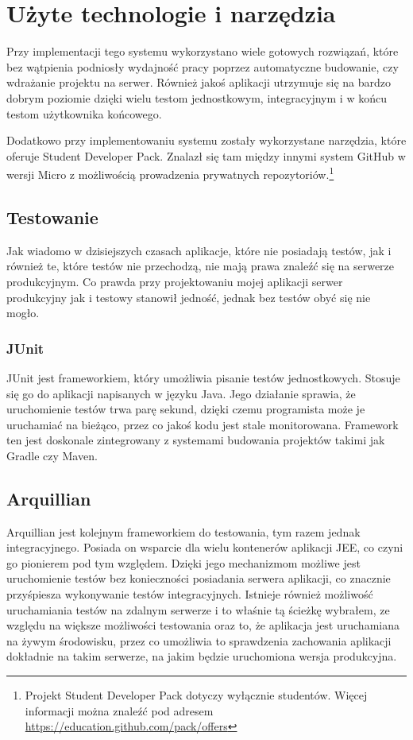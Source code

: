 \section{Użyte technologie i narzędzia}
Przy implementacji tego systemu wykorzystano wiele gotowych rozwiązań, które bez wątpienia podniosły wydajność pracy poprzez automatyczne budowanie, czy wdrażanie projektu na serwer. Również jakoś aplikacji utrzymuje się na bardzo dobrym poziomie dzięki wielu testom jednostkowym, integracyjnym i w końcu testom użytkownika końcowego. 

Dodatkowo przy implementowaniu systemu zostały wykorzystane narzędzia, które oferuje Student Developer Pack. Znalazł się tam między innymi system GitHub w wersji Micro z możliwością prowadzenia prywatnych repozytoriów.\footnote{Projekt Student Developer Pack dotyczy wyłącznie studentów. Więcej informacji można znaleźć pod adresem \url{https://education.github.com/pack/offers}}

\subsection{Testowanie}
Jak wiadomo w dzisiejszych czasach aplikacje, które nie posiadają testów, jak i również te, które testów nie przechodzą, nie mają prawa znaleźć się na serwerze produkcyjnym. Co prawda przy projektowaniu mojej aplikacji serwer produkcyjny jak i testowy stanowił jedność, jednak bez testów obyć się nie mogło.

\subsubsection{JUnit}
JUnit jest frameworkiem, który umożliwia pisanie testów jednostkowych. Stosuje się go do aplikacji napisanych w języku Java. Jego działanie sprawia, że uruchomienie testów trwa parę sekund, dzięki czemu programista może je uruchamiać na bieżąco, przez co jakoś kodu jest stale monitorowana. Framework ten jest doskonale zintegrowany z systemami budowania projektów takimi jak Gradle czy Maven. 

\subsection{Arquillian}
Arquillian jest kolejnym frameworkiem do testowania, tym razem jednak integracyjnego. Posiada on wsparcie dla wielu kontenerów aplikacji JEE, co czyni go pionierem pod tym względem. Dzięki jego mechanizmom możliwe jest uruchomienie testów bez konieczności posiadania serwera aplikacji, co znacznie przyśpiesza wykonywanie testów integracyjnych. Istnieje również możliwość uruchamiania testów na zdalnym serwerze i to właśnie tą ścieżkę wybrałem, ze względu na większe możliwości testowania oraz to, że aplikacja jest uruchamiana na żywym środowisku, przez co umożliwia to sprawdzenia zachowania aplikacji dokładnie na takim serwerze, na jakim będzie uruchomiona wersja produkcyjna.


